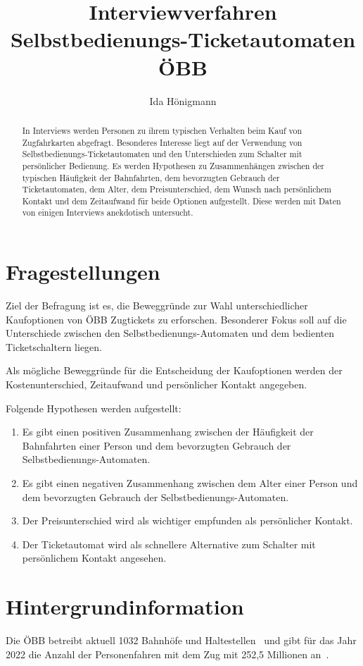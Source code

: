 \documentclass[]{article}
\title{Interviewverfahren\\ Selbstbedienungs-Ticketautomaten ÖBB}
\author{Ida Hönigmann}
\begin{document}
\maketitle

\begin{abstract}
	In Interviews werden Personen zu ihrem typischen Verhalten beim Kauf von Zugfahrkarten abgefragt. Besonderes Interesse liegt auf der Verwendung von Selbstbedienungs-Ticketautomaten und den Unterschieden zum Schalter mit persönlicher Bedienung. Es werden Hypothesen zu Zusammenhängen zwischen der typischen Häufigkeit der Bahnfahrten, dem bevorzugten Gebrauch der Ticketautomaten, dem Alter, dem Preisunterschied, dem Wunsch nach persönlichem Kontakt und dem Zeitaufwand für beide Optionen aufgestellt. Diese werden mit Daten von einigen Interviews anekdotisch untersucht.
\end{abstract}

\section{Fragestellungen}
\label{sec:fragestellungen}

Ziel der Befragung ist es, die Beweggründe zur Wahl unterschiedlicher Kaufoptionen von ÖBB Zugtickets zu erforschen. Besonderer Fokus soll auf die Unterschiede zwischen den Selbstbedienungs-Automaten und dem bedienten Ticketschaltern liegen.

Als mögliche Beweggründe für die Entscheidung der Kaufoptionen werden der Kostenunterschied, Zeitaufwand und persönlicher Kontakt angegeben.

Folgende Hypothesen werden aufgestellt:

\begin{enumerate}[label={H\arabic*: }]
	\item Es gibt einen positiven Zusammenhang zwischen der Häufigkeit der Bahnfahrten einer Person und dem bevorzugten Gebrauch der Selbstbedienungs-Automaten.
	\item Es gibt einen negativen Zusammenhang zwischen dem Alter einer Person und dem bevorzugten Gebrauch der Selbstbedienungs-Automaten.
	\item Der Preisunterschied wird als wichtiger empfunden als persönlicher Kontakt.
	\item Der Ticketautomat wird als schnellere Alternative zum Schalter mit persönlichem Kontakt angesehen.
\end{enumerate}


\section{Hintergrundinformation}
Die ÖBB betreibt aktuell 1032 Bahnhöfe und Haltestellen~\cite{oebbinfra_zahlendatenfakten2022} und gibt für das Jahr 2022 die Anzahl der Personenfahren mit dem Zug mit 252,5 Millionen an~\cite{oebb_zahlendatenfakten202223}.
\end{document}
